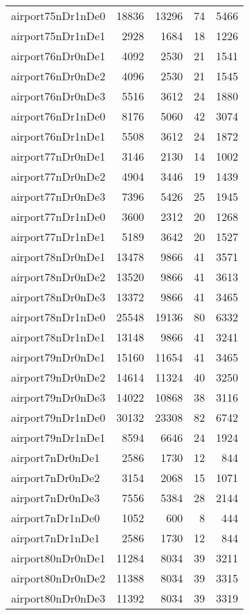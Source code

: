 \begin{tabular}{lrrrr}
airport75nDr1nDe0 & 18836 & 13296 & 74 & 5466 \\
airport75nDr1nDe1 & 2928 & 1684 & 18 & 1226 \\
airport76nDr0nDe1 & 4092 & 2530 & 21 & 1541 \\
airport76nDr0nDe2 & 4096 & 2530 & 21 & 1545 \\
airport76nDr0nDe3 & 5516 & 3612 & 24 & 1880 \\
airport76nDr1nDe0 & 8176 & 5060 & 42 & 3074 \\
airport76nDr1nDe1 & 5508 & 3612 & 24 & 1872 \\
airport77nDr0nDe1 & 3146 & 2130 & 14 & 1002 \\
airport77nDr0nDe2 & 4904 & 3446 & 19 & 1439 \\
airport77nDr0nDe3 & 7396 & 5426 & 25 & 1945 \\
airport77nDr1nDe0 & 3600 & 2312 & 20 & 1268 \\
airport77nDr1nDe1 & 5189 & 3642 & 20 & 1527 \\
airport78nDr0nDe1 & 13478 & 9866 & 41 & 3571 \\
airport78nDr0nDe2 & 13520 & 9866 & 41 & 3613 \\
airport78nDr0nDe3 & 13372 & 9866 & 41 & 3465 \\
airport78nDr1nDe0 & 25548 & 19136 & 80 & 6332 \\
airport78nDr1nDe1 & 13148 & 9866 & 41 & 3241 \\
airport79nDr0nDe1 & 15160 & 11654 & 41 & 3465 \\
airport79nDr0nDe2 & 14614 & 11324 & 40 & 3250 \\
airport79nDr0nDe3 & 14022 & 10868 & 38 & 3116 \\
airport79nDr1nDe0 & 30132 & 23308 & 82 & 6742 \\
airport79nDr1nDe1 & 8594 & 6646 & 24 & 1924 \\
airport7nDr0nDe1 & 2586 & 1730 & 12 & 844 \\
airport7nDr0nDe2 & 3154 & 2068 & 15 & 1071 \\
airport7nDr0nDe3 & 7556 & 5384 & 28 & 2144 \\
airport7nDr1nDe0 & 1052 & 600 & 8 & 444 \\
airport7nDr1nDe1 & 2586 & 1730 & 12 & 844 \\
airport80nDr0nDe1 & 11284 & 8034 & 39 & 3211 \\
airport80nDr0nDe2 & 11388 & 8034 & 39 & 3315 \\
airport80nDr0nDe3 & 11392 & 8034 & 39 & 3319 \\

\end{tabular}
